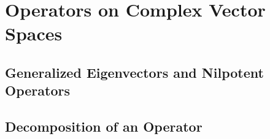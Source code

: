 \chapter{Operators on Complex Vector Spaces}

\section{Generalized Eigenvectors and Nilpotent Operators}

\section{Decomposition of an Operator}

